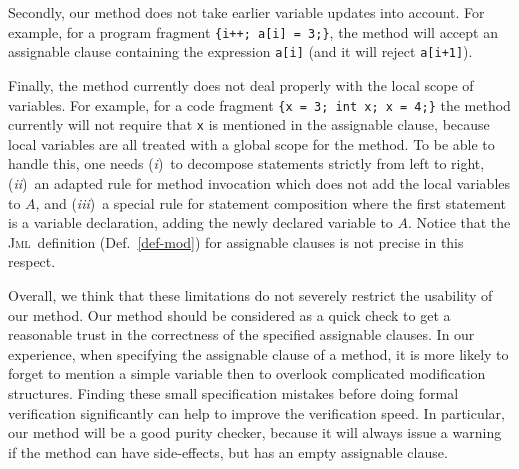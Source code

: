 \documentclass[a4paper]{llncs}
\newcommand{\jml}{\textsc{Jml}}
\begin{document}
Secondly, our method does not take earlier variable updates into
account. For example, for a program fragment \texttt{\{i++; a[i] =
3;\}}, the method will accept an assignable clause containing the
expression \texttt{a[i]} (and it will reject \texttt{a[i+1]}).

Finally, the method currently does not deal properly with the local
scope of variables. For example, for a code fragment \texttt{\{x = 3;
int x; x = 4;\}} the method currently will not require that \texttt{x}
is mentioned in the assignable clause, because local variables are all
treated with a global scope for the method. To be able to handle
this, one needs (\emph{i})~to decompose statements strictly from left
to right, (\emph{ii})~an adapted rule for method invocation which does
not add the local variables to \(A\), and (\emph{iii})~a special rule
for statement composition where the first statement is a variable
declaration, adding the newly declared variable to \(A\). Notice that
the \jml\ definition (Def.~\ref{def-mod}) for assignable clauses is
not precise in this respect.

Overall, we think that these limitations do not severely restrict the
usability of our method. Our method should be considered as a quick
check to get a reasonable trust in the correctness of the specified
assignable clauses. In our experience, when specifying the assignable
clause of a method, it is more likely to forget to mention a simple
variable then to overlook complicated modification structures. Finding 
these small specification mistakes before doing formal verification
significantly can help to improve the verification speed. In
particular, our method will be a good purity checker, because it will
always issue a warning if the method can have side-effects, but has an 
empty assignable clause.
\end{document}
